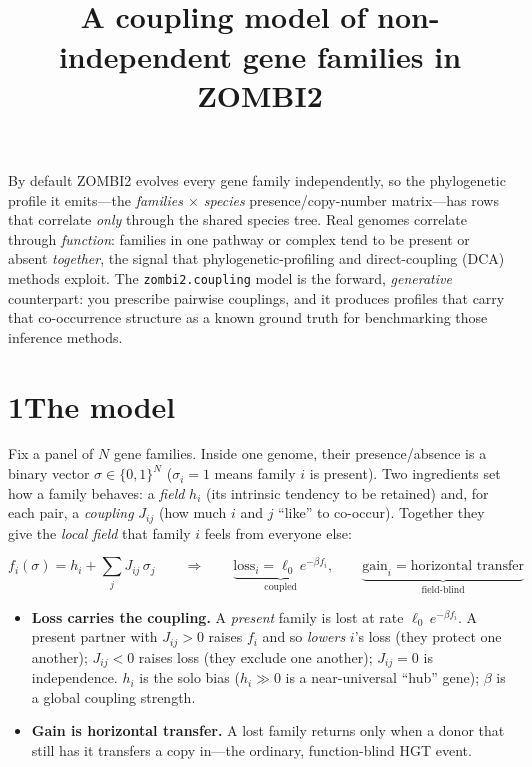 \documentclass[11pt]{article}
\title{\vspace{-1.5cm}{\Large\textcolor{mainblue}{\textsc{How the gene-family coupling model works}}}\\[0.2em]
  {\normalsize A coupling model of non-independent gene families in ZOMBI2}}
\author{}\date{\vspace{-1.2cm}}
\begin{document}
\maketitle\thispagestyle{fancy}\vspace{-0.7cm}

\noindent
By default ZOMBI2 evolves every gene family independently, so the phylogenetic profile it
emits---the \emph{families $\times$ species} presence/copy-number matrix---has rows that
correlate \emph{only} through the shared species tree. Real genomes correlate through
\emph{function}: families in one pathway or complex tend to be present or absent
\emph{together}, the signal that phylogenetic-profiling and direct-coupling (DCA) methods exploit.
The \texttt{zombi2.coupling} model is the forward, \emph{generative} counterpart: you
prescribe pairwise couplings, and it produces profiles that carry that co-occurrence
structure as a known ground truth for benchmarking those inference methods.

\section*{\textcolor{mainblue}{1\quad The model}}
Fix a panel of $N$ gene families. Inside one genome, their presence/absence is a binary
vector $\sigma\in\{0,1\}^N$ ($\sigma_i=1$ means family $i$ is present). Two ingredients set
how a family behaves: a \emph{field} $h_i$ (its intrinsic tendency to be retained) and, for
each pair, a \emph{coupling} $J_{ij}$ (how much $i$ and $j$ ``like'' to co-occur). Together
they give the \emph{local field} that family $i$ feels from everyone else:

\begin{conceptbox}
\vspace{-2pt}
\[
  f_i(\sigma)=h_i+\sum_{j}J_{ij}\,\sigma_j
  \qquad\Longrightarrow\qquad
  \underbrace{\text{loss}_i=\ell_0\,e^{-\beta f_i}}_{\text{coupled}},
  \qquad
  \underbrace{\text{gain}_i=\text{horizontal transfer}}_{\text{field-blind}}
\]
\vspace{-6pt}
\begin{itemize}
\item \textbf{Loss carries the coupling.} A \emph{present} family is lost at rate
  $\ell_0\,e^{-\beta f_i}$. A present partner with $J_{ij}>0$ raises $f_i$ and so
  \emph{lowers} $i$'s loss (they protect one another); $J_{ij}<0$ raises loss (they exclude
  one another); $J_{ij}=0$ is independence. $h_i$ is the solo bias ($h_i\!\gg\!0$ is a
  near-universal ``hub'' gene); $\beta$ is a global coupling strength.
\item \textbf{Gain is horizontal transfer.} A lost family returns only when a donor that
  still has it transfers a copy in---the ordinary, function-blind HGT event.
\end{itemize}
\end{conceptbox}
\end{document}
